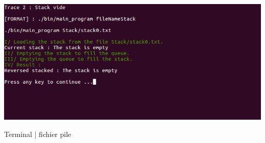 \documentclass[a4paper]{article}
\begin{document}
\begin{center}
\includegraphics[scale=0.4]{trace2.png}

Terminal | fichier pile
\end{center}
\end{document}
